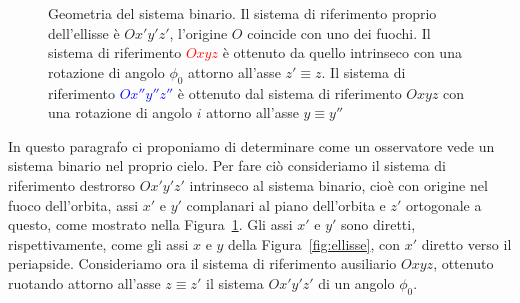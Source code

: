 {\begin{figure}[tb]
  \caption[Geometria del sistema binario]{Geometria del sistema binario. Il
    sistema di riferimento proprio dell'ellisse è $Ox'y'z'$, l'origine $O$
    coincide con uno dei fuochi. Il sistema di riferimento
    \textcolor{red}{$Oxyz$} è ottenuto da quello intrinseco con una rotazione di
    angolo $\phi_0$ attorno all'asse $z' \equiv z$. Il sistema di riferimento
    \textcolor{blue}{$Ox''y''z''$} è ottenuto dal sistema di riferimento $Oxyz$
    con una rotazione di angolo $i$ attorno all'asse $y \equiv y''$}
  \label{fig:geometria-sistema}
\end{figure}
In questo paragrafo ci proponiamo di determinare come un osservatore vede un
sistema binario nel proprio cielo. Per fare ciò consideriamo il sistema di
riferimento destrorso $Ox'y'z'$ intrinseco al sistema binario, cioè con origine
nel fuoco dell'orbita, assi $x'$ e $y'$ complanari al piano dell'orbita e $z'$
ortogonale a questo, come mostrato nella Figura~\ref{fig:geometria-sistema}. Gli
assi $x'$ e $y'$ sono diretti, rispettivamente, come gli assi $x$ e $y$ della
Figura~\ref{fig:ellisse}, con $x'$ diretto verso il periapside. Consideriamo ora
il sistema di riferimento ausiliario $Oxyz$, ottenuto ruotando attorno all'asse
$z\equiv z'$ il sistema $Ox'y'z'$ di un angolo $\phi_0$.

}
